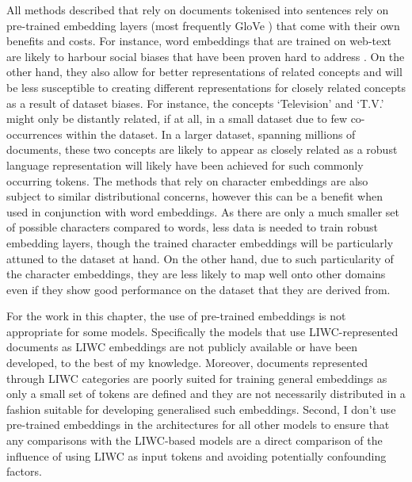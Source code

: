 All methods described that rely on documents tokenised into sentences rely on pre-trained embedding layers (most frequently GloVe \citet{Pennington:2014}) that come with their own benefits and costs. For instance, word embeddings that are trained on web-text are likely to harbour social biases \citep{Bolukbasi:2016} that have been proven hard to address \citep{Gonen:2019}. On the other hand, they also allow for better representations of related concepts and will be less susceptible to creating different representations for closely related concepts as a result of dataset biases. For instance, the concepts `Television' and `T.V.' might only be distantly related, if at all, in a small dataset due to few co-occurrences within the dataset. In a larger dataset, spanning millions of documents, these two concepts are likely to appear as closely related as a robust language representation will likely have been achieved for such commonly occurring tokens.
The methods that rely on character embeddings are also subject to similar distributional concerns, however this can be a benefit when used in conjunction with word embeddings. As there are only a much smaller set of possible characters compared to words, less data is needed to train robust embedding layers, though the trained character embeddings will be particularly attuned to the dataset at hand. On the other hand, due to such particularity of the character embeddings, they are less likely to map well onto other domains even if they show good performance on the dataset that they are derived from.\vspace{5mm}

For the work in this chapter, the use of pre-trained embeddings is not appropriate for some models. Specifically the models that use LIWC-represented documents as LIWC embeddings are not publicly available or have been developed, to the best of my knowledge. Moreover, documents represented through LIWC categories are poorly suited for training general embeddings as only a small set of tokens are defined and they are not necessarily distributed in a fashion suitable for developing generalised such embeddings. Second, I don't use pre-trained embeddings in the architectures for all other models to ensure that any comparisons with the LIWC-based models are a direct comparison of the influence of using LIWC as input tokens and avoiding potentially confounding factors.

